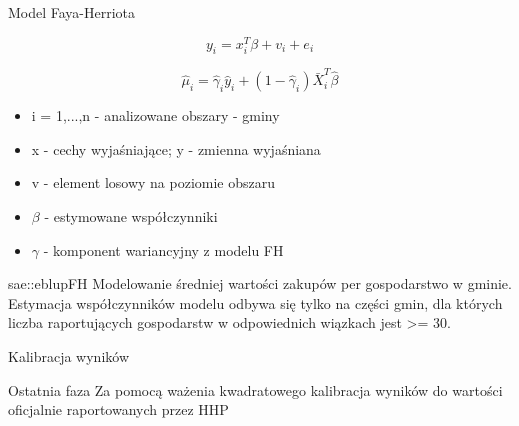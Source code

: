 \documentclass{beamer}
\begin{document}
	\begin{frame}{Model Faya-Herriota}
		\begin{block}{}
			\begin{displaymath}
				y_{i} = x_{i}^T\beta + v_{i} + e_{i}
			\end{displaymath}

			\begin{displaymath}
				\hat{\mu}_{i} = \hat{\gamma}_{i}\hat{y}_{i} + (1-\hat{\gamma}_{i})\bar{X}_{i}^T\hat{\beta}
			\end{displaymath}
			
			\begin{itemize}
				\item{i = 1,...,n - analizowane obszary - gminy}
				\item{x - cechy wyjaśniające; y - zmienna wyjaśniana}
				\item{v - element losowy na poziomie obszaru}
				\item{$\beta$ - estymowane współczynniki}
				\item{$\gamma$ - komponent wariancyjny z modelu FH}
			\end{itemize}
			
		\end{block}		

		\begin{block}{sae::eblupFH}
			\small{Modelowanie średniej wartości zakupów per gospodarstwo w gminie.}
			\footnotesize{Estymacja współczynników modelu odbywa się tylko na części gmin, dla których liczba raportujących	gospodarstw w odpowiednich wiązkach jest >= 30.}
		\end{block}
	\end{frame}

	\begin{frame}{Kalibracja wyników}
		\begin{block}{Ostatnia faza}
			Za pomocą ważenia kwadratowego kalibracja wyników do wartości oficjalnie raportowanych przez HHP
		\end{block}
	\end{frame}
	
\end{document}

